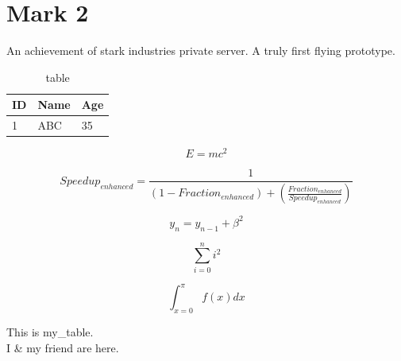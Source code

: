 \documentclass[16pt]{article}
\begin{document}
\section{Mark 2}
\label{mk2}
An achievement of stark industries private server. A truly first flying prototype.
\begin{table}[h]
	\begin{center}
		\begin{tabular}{ |l|l|l| }
			\hline
			\textbf{ID}		&	Name & Age \\
			\hline
			1 & ABC & 35 \\
			\hline
		\end{tabular}
		\caption{table}
		\label{label1}
	\end{center}
\end{table}

\begin{equation}
	E = mc^2
\end{equation}

\begin{equation}
	Speedup_{enhanced} = \frac{1}{(1-Fraction_{enhanced}) + (\frac{Fraction_{enhanced}}{Speedup_{enhanced}})}
\end{equation}

\begin{equation}
y_n = y_{n-1} + \beta^2
\end{equation}

\begin{equation}
\sum_{i=0}^n i^2
\end{equation}

\begin{equation}
\int_{x=0}^{\pi} f(x) dx
\end{equation}

This is my\_table.
\\ I \& my friend are here.
\end{document}
